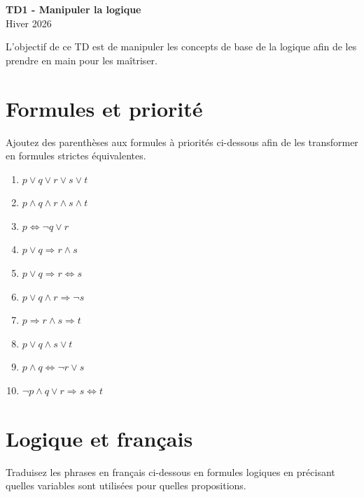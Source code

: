 \documentclass[a4paper,11pt]{article}
\begin{document}
\begin{center}
{\Huge\bfseries TD1 - Manipuler la logique} \\[0.5cm]
{\large Hiver 2026} \\[0.3cm]
\end{center}

\vspace{0.5cm}

L'objectif de ce TD est de manipuler les concepts de base de la logique afin de les prendre en main pour les maîtriser.

\section{Formules et priorité}

Ajoutez des parenthèses aux formules à priorités ci-dessous afin de les transformer en formules strictes équivalentes.

\begin{enumerate}
\item $p \vee q \vee r \vee s \vee t$
\item $p \wedge q \wedge r \wedge s \wedge t$
\item $p \Leftrightarrow \neg q \vee r$
\item $p \vee q \Rightarrow r \wedge s$
\item $p \vee q \Rightarrow r \Leftrightarrow s$
\item $p \vee q \wedge r \Rightarrow \neg s$
\item $p \Rightarrow r \wedge s \Rightarrow t$
\item $p \vee q \wedge s \vee t$
\item $p \wedge q \Leftrightarrow \neg r \vee s$
\item $\neg p \wedge q \vee r \Rightarrow s \Leftrightarrow t$
\end{enumerate}

\section{Logique et français}

Traduisez les phrases en français ci-dessous en formules logiques en précisant quelles variables sont utilisées pour quelles propositions.
\end{document}
